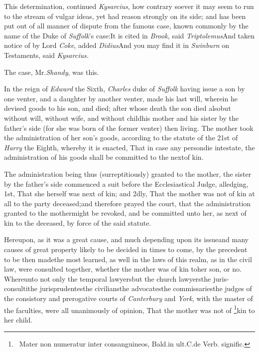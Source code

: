 \documentclass{article}
\begin{document}
This determination, continued \textit{Kysarcius}, how
contrary soever it may seem\break
to run to the stream of vulgar ideas,\break
yet had reason strongly on its side; and has been put out of all
manner of dispute from the famous case, known commonly by the name
of the Duke of \textit{Suffolk}’s case:\tsh It is
cited in \textit{Brook}, said \textit{Triptolemus}\tsh And
taken notice of by Lord \textit{Coke}, added \textit{Didius}\tsk And
you may find it in \textit{Swinburn} on Testaments, said
\textit{Kysarcius.}

The case, Mr.\@ \textit{Shandy}, was this.

In the reign of \textit{Edward} the Sixth,\break
\textit{Charles} duke of \textit{Suffolk} having issue a son
by one venter, and a daughter by\break
another venter, made his last will,\break
wherein he devised goods to his son,\break
and died; after whose death the son died also\tsk but
without will, without wife, and without child\tsk his mother and
his sister by the father’s side (for she was born of the
former venter) then living. The mother took the administration of
her son’s goods, according to the statute of the 21st of \textit{Harry} the Eighth, whereby it is
enacted, That in case any person\break die intestate, the administration
of his goods shall be committed to the next\break of kin.

\newpage
The administration being thus (surreptitiously) granted to the
mother, the sister by the father’s side commenced a suit
before the Ecclesiastical Judge, al\-ledging, 1st, That she herself
was next of kin; and 2dly, That the mother was not of kin at all to
the party deceased;\break and therefore prayed the court, that the
administration granted to the mother\break might be revoked, and be
committed unto her, as next of kin to the deceased, by force of the
said statute.

Hereupon, as it was a great cause, and much depending upon its issue\tsk and many
causes of great property likely to be decided in times to come, by the precedent to
be then made\tsh the most learned, as well in the laws of this realm, as in the
civil law, were consulted together, whether the mother was
of kin to\pb her son, or no.
\tsk Whereunto not only the temporal lawyers\tsk but the church lawyers\tsk the
juris-consulti\tsk the jurisprudentes\tsk the civilians\tsk the advocates\tsk the
commissaries\tsk the judges of the consistory and prerogative courts of
\textit{Canterbury} and \textit{York}, with the master of the faculties, were all
unanimously of opinion, That the mother was not of
\footnote{\ Mater non numeratur
inter consanguineos, Bald.\@ in ult.\@ C.\@ de Verb.
signific.}\break kin to her child.\tsh
\end{document}

